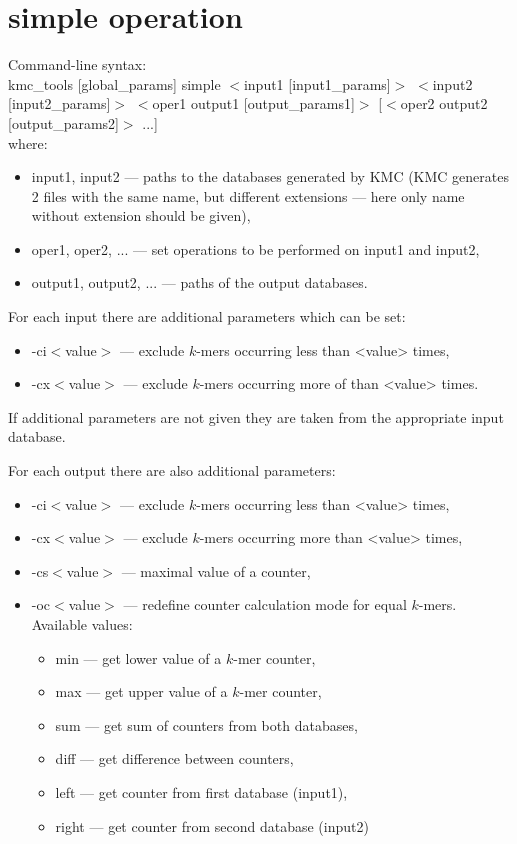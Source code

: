 \clearpage
\section{simple operation}
\label{sec:simple}
Command-line syntax: \\
kmc\_tools [global\_params] simple $<$input1 [input1\_params]$>$ $<$input2 [input2\_params]$>$ $<$oper1 output1 [output\_params1]$>$ [$<$oper2 output2 [output\_params2]$>$ ...] \\


where: 
\begin{itemize}
	\item \textsf{input1, input2} --- paths to the databases generated by \textsf{KMC} (\textsf{KMC} generates 2 files with the same name, but different extensions --- here only name without extension should be given),
	\item \textsf{oper1, oper2, ...} --- set operations to be performed on input1 and input2,
	\item \textsf{output1, output2, ...} --- paths of the output databases.
\end{itemize}

For each \textsf{input} there are additional parameters which can be set:
\begin{itemize}
	\item \textsf{-ci$<$value$>$} --- exclude $k$-mers occurring less than <value> times,
	\item \textsf{-cx$<$value$>$} --- exclude $k$-mers occurring more of than <value> times.
\end{itemize}

If additional parameters are not given they are taken from the appropriate input database. 

For each output there are also additional parameters:
\begin{itemize}
	\item \textsf{-ci$<$value$>$} --- exclude $k$-mers occurring less than <value> times,
	\item \textsf{-cx$<$value$>$} --- exclude $k$-mers occurring more than <value> times,
	\item \textsf{-cs$<$value$>$} --- maximal value of a counter,
	\item \textsf{-oc$<$value$>$} --- redefine counter calculation mode for equal $k$-mers.
	Available values:
	\begin{itemize}
		\item \textsf{min} --- get lower value of a $k$-mer counter,
		\item \textsf{max} --- get upper value of a $k$-mer counter,
		\item \textsf{sum} --- get sum of counters from both databases,
		\item \textsf{diff}  --- get difference between counters,
		\item \textsf{left} --- get counter from first database (input1),
		\item \textsf{right} --- get counter from second database (input2)
	\end{itemize}
\end{itemize}

